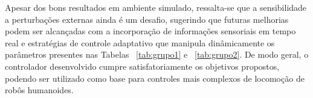 Apesar dos bons resultados em ambiente simulado, ressalta-se que a sensibilidade a perturbações externas ainda é um desafio, sugerindo que futuras melhorias podem ser alcançadas com a incorporação de informações sensoriais em tempo real e estratégias de controle adaptativo que manipula dinâmicamente os parâmetros presentes nas Tabelas ~\ref{tab:grupo1} e ~\ref{tab:grupo2}. De modo geral, o controlador desenvolvido cumpre satisfatoriamente os objetivos propostos, podendo ser utilizado como base para controles mais complexos de locomoção de robôs humanoides.



